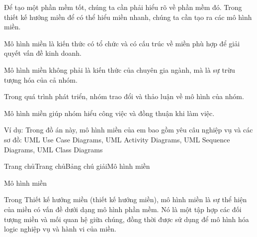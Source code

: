 
Để tạo một phần mềm tốt, chúng ta cần phải hiểu rõ về phần mềm đó. Trong thiết kế hướng miền để có thể hiểu miền nhanh, chúng ta cần  tạo ra các mô hình miền.

Mô hình miền là kiến thức có tổ chức và có cấu trúc về miền phù hợp để giải quyết vấn đề kinh doanh.

Mô hình miền không phải là kiến thức của chuyên gia ngành, mà là sự trừu tượng hóa của cả nhóm.

Trong quá trình phát triển, nhóm trao đổi và thảo luận về mô hình của nhóm.

Mô hình miền giúp nhóm hiểu công việc và đồng thuận khi làm việc.

 Ví dụ:   Trong đồ án này, mô hình miền của em bao gồm yêu câu nghiệp vụ và các sơ đồ: UML Use Case Diagrams, UML Activity Diagrams, UML Sequence Diagrams, UML Class Diagrams 
 











Trang chủTrang chủBảng chú giảiMô hình miền

Mô hình miền

Trong Thiết kế hướng miền (thiết kế hướng miền), mô hình miền là sự thể hiện của miền có vấn đề dưới dạng mô hình phần mềm. Nó là một tập hợp các đối tượng miền và mối quan hệ giữa chúng, đồng thời được sử dụng để mô hình hóa logic nghiệp vụ và hành vi của miền.

